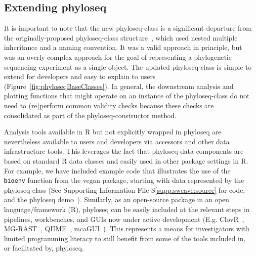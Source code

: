 \documentclass[10pt]{article}\usepackage{graphicx, color}
\newcommand{\R}{{\textsf{R}}}
\newcommand{\code}[1]{{\texttt{#1}}}
\begin{document}
\subsection*{Extending phyloseq}
It is important to note that the new phyloseq-class
is a significant departure from 
the originally-proposed phyloseq-class structure~\cite{phyloseqPSB}, 
which used nested multiple inheritance and a naming convention. 
It was a valid approach in principle, 
but was an overly complex approach for the goal of
representing a phylogenetic sequencing experiment as a single object.
The updated phyloseq-class is simple to extend for developers
and easy to explain to users (Figure~\ref{fig:phyloseqBaseClasses}).
In general, the downstream analysis and plotting functions
that might operate on an instance of the phyloseq-class
do not need to (re)perform common validity checks 
because these checks are consolidated as part of
the phyloseq-constructor method.
      
Analysis tools available in \R{} but not explicitly wrapped in phyloseq
are nevertheless available to users and developers 
via accessors and other data infrastructure tools. 
This leverages the fact that phyloseq data components
are based on standard \R{} data classes
and easily used in other package settings in \R{}. 
For example, we have included example code that illustrates
the use of the \code{bioenv} function from the vegan package,
starting with data represented by the phyloseq-class
(See Supporting Information File S\ref{supp:sweave:source} for code,
and the phyloseq demo~\cite{phyloseq:demo}).
Similarly,
as an open-source package in an open language/framework (\R), 
phyloseq can be easily included
at the relevant steps in pipelines, workbenches, and GUIs
now under active development
(E.g. ClovR~\cite{Angiuoli:2011ib},
MG-RAST~\cite{Meyer:2008db}, 
QIIME~\cite{caporaso2010qiime}, 
mcaGUI~\cite{Copeland:2012co}).
This represents a means for investigators with limited programming literacy
to still benefit from some of the tools included in, or facilitated by, phyloseq.


\end{document}

